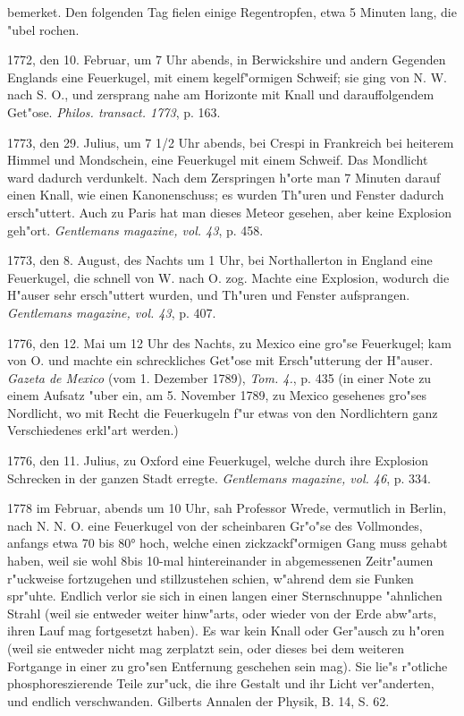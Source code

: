 \documentclass[a4paper, 11pt, oneside, polutonikogreek, german]{article}
\begin{document}
bemerket. Den folgenden Tag fielen einige Regentropfen, etwa 5 Minuten lang, die "ubel rochen.

1772, den 10. Februar, um 7 Uhr abends, in Berwickshire und andern Gegenden Englands eine Feuerkugel, mit einem kegelf"ormigen Schweif; sie ging von N. W. nach S. O., und zersprang nahe am Horizonte mit Knall und darauffolgendem Get"ose. \emph{Philos. transact. 1773}, p. 163.

1773, den 29. Julius, um 7 1/2 Uhr abends, bei Crespi in Frankreich bei heiterem Himmel und Mondschein, eine Feuerkugel mit einem Schweif. Das Mondlicht ward dadurch verdunkelt. Nach dem Zerspringen h"orte man 7 Minuten darauf einen Knall, wie einen Kanonenschuss; es wurden Th"uren und Fenster dadurch ersch"uttert. Auch zu Paris hat man dieses Meteor gesehen, aber keine Explosion geh"ort. \emph{Gentlemans magazine, vol. 43}, p. 458.

1773, den 8. August, des Nachts um 1 Uhr, bei Northallerton in England eine Feuerkugel, die schnell von W. nach O. zog. Machte eine Explosion, wodurch die H"auser sehr ersch"uttert wurden, und Th"uren und Fenster aufsprangen. \emph{Gentlemans magazine, vol. 43}, p. 407.

1776, den 12. Mai um 12 Uhr des Nachts, zu Mexico eine gro"se Feuerkugel; kam von O. und machte ein schreckliches Get"ose mit Ersch"utterung der H"auser. \emph{Gazeta de Mexico} (vom 1. Dezember 1789), \emph{Tom. 4.}, p. 435 (in einer Note zu einem Aufsatz "uber ein, am 5. November 1789, zu Mexico gesehenes gro"ses Nordlicht, wo mit Recht die Feuerkugeln f"ur etwas von den Nordlichtern ganz Verschiedenes erkl"art werden.)

1776, den 11. Julius, zu Oxford eine Feuerkugel, welche durch ihre Explosion Schrecken in der ganzen Stadt erregte. \emph{Gentlemans magazine, vol. 46}, p. 334.

1778 im Februar, abends um 10 Uhr, sah Professor Wrede, vermutlich in Berlin, nach N. N. O. eine Feuerkugel von der scheinbaren Gr"o"se des Vollmondes, anfangs etwa 70 bis 80° hoch, welche einen zickzackf"ormigen Gang muss gehabt haben, weil sie wohl 8bis 10-mal hintereinander in abgemessenen Zeitr"aumen r"uckweise fortzugehen und stillzustehen schien, w"ahrend dem sie Funken spr"uhte. Endlich verlor sie sich in einen langen einer Sternschnuppe "ahnlichen Strahl (weil sie entweder weiter hinw"arts, oder wieder von der Erde abw"arts, ihren Lauf mag fortgesetzt haben). Es war kein Knall oder Ger"ausch zu h"oren (weil sie entweder nicht mag zerplatzt sein, oder dieses bei dem weiteren Fortgange in einer zu gro"sen Entfernung geschehen sein mag). Sie lie"s r"otliche phosphoreszierende Teile zur"uck, die ihre Gestalt und ihr Licht ver"anderten, und endlich verschwanden. Gilberts Annalen der Physik, B. 14, S. 62.
\end{document}
